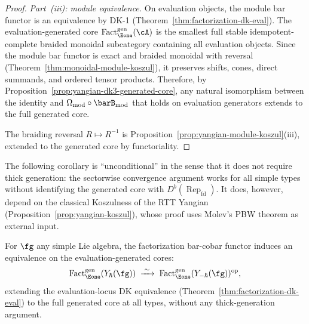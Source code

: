 \begin{proof}
\emph{Part~(iii): module equivalence.}
On evaluation objects, the module bar functor is an equivalence by
DK-1 (Theorem~\ref{thm:factorization-dk-eval}). The
evaluation-generated core
$\operatorname{Fact}_{\Eone}^{\mathrm{gen}}(\cA)$ is the
smallest full stable idempotent-complete braided monoidal subcategory
containing all evaluation objects. Since the module bar functor
is exact and braided monoidal with reversal
(Theorem~\ref{thm:monoidal-module-koszul}), it preserves shifts,
cones, direct summands, and ordered tensor products. Therefore, by
Proposition~\ref{prop:yangian-dk3-generated-core}, any natural
isomorphism between the identity and
$\Omega_{\mathrm{mod}} \circ \barB_{\mathrm{mod}}$ that holds on
evaluation generators extends to the full generated core.

The braiding reversal $R \mapsto R^{-1}$ is
Proposition~\ref{prop:yangian-module-koszul}(iii), extended to the
generated core by functoriality.
\end{proof}

\begin{remark}
\label{rem:dk23-unconditional-scope}
The following corollary is ``unconditional'' in the sense that it
does not require thick generation: the sectorwise convergence
argument works for all simple types without identifying the
generated core with $D^b(\operatorname{Rep}_{\mathrm{fd}})$.
It does, however, depend on the classical Koszulness of the RTT
Yangian (Proposition~\ref{prop:yangian-koszul}), whose proof
uses Molev's PBW theorem \cite{molev-yangians} as external input.
\end{remark}

\begin{corollary}
\label{cor:dk23-all-types}
For $\fg$ any simple Lie algebra, the factorization bar-cobar
functor induces an equivalence on the evaluation-generated cores:
\begin{equation}\label{eq:dk23-all-types}
\operatorname{Fact}_{\Eone}^{\mathrm{gen}}
 (Y_\hbar(\fg))
\;\xrightarrow{\;\sim\;}\;
\operatorname{Fact}_{\Eone}^{\mathrm{gen}}
 (Y_{-\hbar}(\fg))^{\mathrm{op}},
\end{equation}
extending the evaluation-locus DK equivalence
\textup{(}Theorem~\textup{\ref{thm:factorization-dk-eval}}\textup{)}
to the full generated core at all types, without any
thick-generation argument.
\end{corollary}

